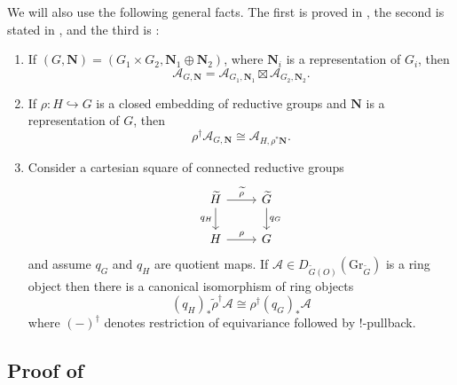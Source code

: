 \documentclass[11pt]{amsart}
\theoremstyle{definition}
\theoremstyle{plain}
\theoremstyle{remark}
\begin{document}
    We will also use the following general facts. The first is proved in \cite[3(vii)]{BFN2018}, the second is stated in \cite[5(xi)]{BFN-Ring}, and the third is \cite[Proposition 3.3]{GannonWilliams2026}:
    \begin{enumerate}[label=\roman*)]
        \item If $(G,\mathbf{N}) = (G_1 \times G_2, \mathbf{N}_1 \oplus \mathbf{N}_2)$, where $\mathbf{N}_i$ is a representation of $G_i$, then
        \begin{equation}\label{equation-fact1}
            \mathcal{A}_{G,\mathbf{N}} = \mathcal{A}_{G_1,\mathbf{N}_1} \boxtimes \mathcal{A}_{G_2,\mathbf{N}_2}.
        \end{equation}
        
        \item If $\rho\colon H \hookrightarrow G$ is a closed embedding of reductive groups and $\mathbf{N}$ is a representation of $G$, then
        \begin{equation}\label{equation-fact2}
            \rho^\dagger\mathcal{A}_{G,\mathbf{N}} \cong \mathcal{A}_{H,\rho^*\mathbf{N}}.
        \end{equation}

        \item Consider a cartesian square of connected reductive groups
        \[
            \begin{tikzcd}
                \widetilde{H} \arrow[r, "\widetilde{\rho}"]\arrow[d, "q_H"'] & \widetilde{G} \arrow[d, "q_G"] \\
                H \arrow[r, "\rho"] & G
            \end{tikzcd}
        \]
        and assume $q_G$ and $q_H$ are quotient maps. If $\mathcal{A} \in D_{\widetilde{G}(O)}(\mathrm{Gr}_{\widetilde{G}})$ is a ring object then there is a canonical isomorphism of ring objects
        \begin{equation}\label{equation-square}
            (q_H)_*\widetilde{\rho}^\dagger\mathcal{A} \cong \rho^\dagger(q_G)_*\mathcal{A}
        \end{equation}
        where $(-)^\dagger$ denotes restriction of equivariance followed by $!$-pullback.
    \end{enumerate}
    
    \subsection{Proof of \texorpdfstring{}{Theorem 1.1}}
\end{document}

